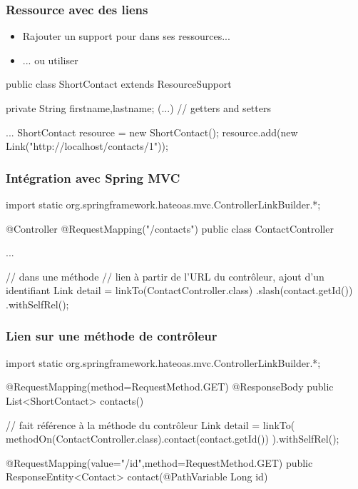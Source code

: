 \begin{frame}[fragile]
 \frametitle{Ressource avec des liens}

 \begin{itemize}
  \item Rajouter un support pour  dans ses ressources...
  \item ... ou utiliser 
 \end{itemize}

 \begin{javacode}
public class ShortContact extends ResourceSupport {

  private String firstname,lastname;
  (...) // getters and setters
}
...
ShortContact resource = new ShortContact();
resource.add(new Link("http://localhost/contacts/1"));
 \end{javacode}

\end{frame}

\begin{frame}[fragile]
 \frametitle{Intégration avec Spring MVC}

 \begin{javacode}
import static org.springframework.hateoas.mvc.ControllerLinkBuilder.*;

@Controller
@RequestMapping("/contacts")
public class ContactController {
  ...

  // dans une m\'ethode
  // lien \`a partir de l'URL du contr\^oleur, ajout d'un identifiant
  Link detail = linkTo(ContactController.class)
    .slash(contact.getId())
    .withSelfRel();

}
 \end{javacode}

\end{frame}

\begin{frame}[fragile]
 \frametitle{Lien sur une méthode de contrôleur}

 \begin{javacode}
import static org.springframework.hateoas.mvc.ControllerLinkBuilder.*;

@RequestMapping(method=RequestMethod.GET)
@ResponseBody
public List<ShortContact> contacts() {

  // fait r\'ef\'erence \`a la m\'ethode du contr\^oleur
  Link detail = linkTo(
    methodOn(ContactController.class).contact(contact.getId())
  ).withSelfRel();

}

@RequestMapping(value="/{id}",method=RequestMethod.GET)
public ResponseEntity<Contact> contact(@PathVariable Long id) {	}

 \end{javacode}

\end{frame}
